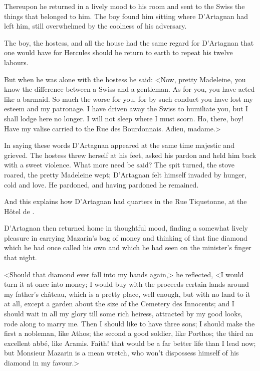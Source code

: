 Thereupon he returned in a lively mood to his room and sent to the Swiss the things that belonged to him. The boy found him sitting where D'Artagnan had left him, still overwhelmed by the coolness of his adversary.

The boy, the hostess, and all the house had the same regard for D'Artagnan that one would have for Hercules should he return to earth to repeat his twelve labours.

But when he was alone with the hostess he said: <Now, pretty Madeleine, you know the difference between a Swiss and a gentleman. As for you, you have acted like a barmaid. So much the worse for you, for by such conduct you have lost my esteem and my patronage. I have driven away the Swiss to humiliate you, but I shall lodge here no longer. I will not sleep where I must scorn. Ho, there, boy! Have my valise carried to the  Rue des Bourdonnais. Adieu, madame.>

In saying these words D'Artagnan appeared at the same time majestic and grieved. The hostess threw herself at his feet, asked his pardon and held him back with a sweet violence. What more need be said? The spit turned, the stove roared, the pretty Madeleine wept; D'Artagnan felt himself invaded by hunger, cold and love. He pardoned, and having pardoned he remained.

And this explains how D'Artagnan had quarters in the Rue Tiquetonne, at the Hôtel de .

D'Artagnan then returned home in thoughtful mood, finding a somewhat lively pleasure in carrying Mazarin's bag of money and thinking of that fine diamond which he had once called his own and which he had seen on the minister's finger that night.

<Should that diamond ever fall into my hands again,> he reflected, <I would turn it at once into money; I would buy with the proceeds certain lands around my father's château, which is a pretty place, well enough, but with no land to it at all, except a garden about the size of the Cemetery des Innocents; and I should wait in all my glory till some rich heiress, attracted by my good looks, rode along to marry me. Then I should like to have three sons; I should make the first a nobleman, like Athos; the second a good soldier, like Porthos; the third an excellent abbé, like Aramis. Faith! that would be a far better life than I lead now; but Monsieur Mazarin is a mean wretch, who won't dispossess himself of his diamond in my favour.>

